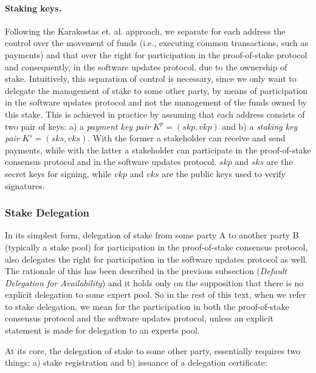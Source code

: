 \paragraph{Staking keys.}
Following the Karakostas et. al. \cite{stakepools} approach, we separate for each address the control over the movement of funds (i.e., executing common transactions, such as payments) and that over the right for participation in the proof-of-stake protocol and consequently, in the software updates protocol, due to the ownership of stake. Intuitively, this separation of control is necessary, since we only want to delegate the management of stake to some other party, by means of participation in the software updates protocol and not the management of the funds owned by this stake. This is achieved in practice by assuming that each address consists of two pair of keys: a) a \emph{payment key pair} $K^p = (skp,vkp)$ and b) a \emph{staking key pair} $K^s = (sks, vks)$. With the former a stakeholder can receive and send payments, while with the latter a stakeholder can participate in the proof-of-stake consensus protocol and in the software updates protocol. $skp$ and $sks$ are the secret keys for signing, while $vkp$ and $vks$ are the public keys used to verify signatures.

\subsubsection*{Stake Delegation}
In its simplest form, delegation of stake from some party A to another party B (typically a stake pool) for participation in the proof-of-stake consensus protocol, also delegates the right for participation in the software updates protocol as well. The rationale of this has been described in the previous subsection (\emph{Default Delegation for Availability}) and it holds only on the supposition that there is no explicit delegation to some expert pool. So in the rest of this text, when we refer to stake delegation, we mean for the participation in both the proof-of-stake consensus protocol and the software updates protocol, unless an explicit statement is made for delegation to an experts pool.

At its core, the delegation of stake to some other party, essentially requires two things: a) stake registration and b) issuance of a delegation certificate:


